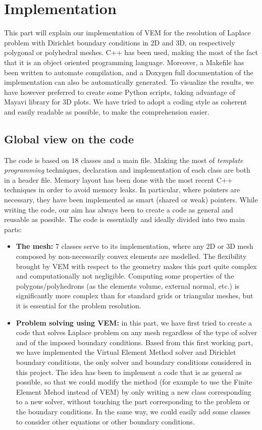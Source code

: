 \newpage
\section{Implementation}

This part will explain our implementation of VEM for the resolution of Laplace problem with Dirichlet boundary conditions in $2$D and $3$D, on respectively polygonal or polyhedral meshes. C++ has been used, making the most of the fact that it is an object oriented programming language. Moreover, a Makefile has been written to automate compilation, and a Doxygen full documentation of the implementation can also be automatically generated. To visualize the results, we have however preferred to create some Python scripts, taking advantage of Mayavi library for $3$D plots. We have tried to adopt a coding style as coherent and easily readable as possible, to make the comprehension easier. 

\subsection{Global view on the code}
The code is based on $18$ classes and a main file. Making the most of \textit{template programming} techniques, declaration and implementation of each class are both in a header file. Memory layout has been done with the most recent C++ techniques in order to avoid memory leaks. In particular, where pointers are necessary, they have been implemented as smart (shared or weak) pointers. While writing the code, our aim has always been to create a code as general and reusable as possible. The code is essentially and ideally divided into two main parts:
\begin{itemize}
\item \textbf{The mesh:} $7$ classes serve to its implementation, where any $2$D or $3$D mesh composed by non-necessarily convex elements are modelled. The flexibility brought by VEM with respect to the geometry makes this part quite complex and computationally not negligible. Computing some properties of the polygons/polyhedrons (as the elements volume, external normal, etc.) is significantly more complex than for standard grids or triangular meshes, but it is essential for the problem resolution. 
\item \textbf{Problem solving using VEM:} in this part, we have first tried to create a code that solves Laplace problem on any mesh regardless of the type of solver and of the imposed boundary conditions. Based from this first working part, we have implemented the Virtual Element Method solver and Dirichlet boundary conditions, the only solver and boundary conditions considered in this project. The idea has been to implement a code that is as general as possible, so that we could modify the method (for example to use the Finite Element Mehod instead of VEM) by only writing a new class corresponding to a new solver, without touching the part corresponding to the problem or the boundary conditions. In the same way, we could easily add some classes to consider other equations or other boundary conditions. 
\end{itemize}


